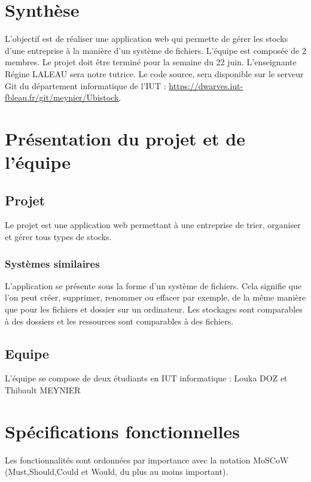\documentclass[a4paper, 12pt]{report}
\begin{document}
\tableofcontents


\newpage

\chapter*{Synthèse}
	L’objectif est de réaliser une application web qui permette de gérer les stocks d’une entreprise à la manière d'un système de fichiers. 
	L’équipe est composée de 2 membres.
	Le projet doit être terminé pour la semaine du 22 juin. 
	L’enseignante Régine LALEAU sera notre tutrice. 
	Le code source, sera disponible sur le serveur Git du département informatique de l'IUT : \url{https://dwarves.iut-fbleau.fr/git/meynier/Ubistock}. 

 \chapter{Présentation du projet et de l’équipe}

	\section{Projet}
		Le projet est une application web permettant à une entreprise de trier, organiser et gérer tous types de stocks. 

		\subsection{Systèmes similaires}
			L’application se présente sous la forme d’un système de fichiers. Cela signifie que l’on peut créer, supprimer, renommer ou effacer par exemple, de la même manière que pour les fichiers et dossier sur un ordinateur. Les stockages sont comparables à des dossiers et les ressources sont comparables à des fichiers.

	\section{Equipe}
		L’équipe se compose de deux étudiants en IUT informatique : Louka DOZ et Thibault MEYNIER  

\chapter{Spécifications fonctionnelles}
	Les fonctionnalités sont ordonnées par importance avec la notation MoSCoW (Must,Should,Could et Would, du plus au moins important).
\end{document}
